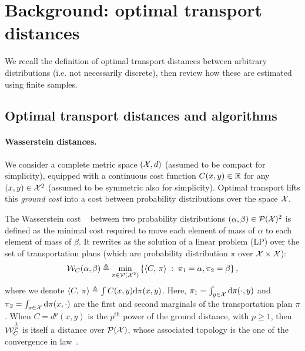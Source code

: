 \section{Background: optimal transport distances}

We recall the definition of optimal transport distances between arbitrary distributions (i.e. not necessarily discrete), then review how these are estimated using finite samples.

\subsection{Optimal transport distances and algorithms}

\paragraph{Wasserstein distances.} 

We consider a complete metric space $(\mathcal{X},d)$ (assumed to be compact for simplicity), equipped
with a continuous cost function $C(x,y) \in \mathbb{R}$ for any $(x,y) \in \mathcal{X}^2$ (assumed to be symmetric also for simplicity). 
%
Optimal transport lifts this \textit{ground cost} into a cost between probability
distributions over the space $\mathcal{X}$. 
%

The Wasserstein cost   between two probability distributions $(\alpha, \beta) \in \mathcal{P}(\mathcal{X})^2$ is defined as the minimal cost required to move each element of mass of $\alpha$ to each element of mass of $\beta$. It rewrites as the solution of a
linear problem (LP) over the set of transportation plans (which are probability distribution $\pi$ over $\mathcal{X} \times \mathcal{X}$):
\begin{equation}\label{eq:wass}
    \mathcal{W}_C(\alpha, \beta) \triangleq 
    \min_{\pi \in \mathcal{P}(\mathcal{X}^2)}
    \left\{ 
    	\langle C,\,\pi\rangle
	 \;:\;  \pi_1=\alpha, \pi_2=\beta \right\},
\end{equation}
where we denote $\langle C,\,\pi\rangle \triangleq \int C(x,y) \textrm{d}\pi(x,y)$. Here,  
$\pi_1 = \int_{y\in \mathcal{X}} \textrm{d} \pi(\cdot, y)$ and $\pi_2 = \int_{x\in \mathcal{X}} \textrm{d}
\pi(x, \cdot)$ are the first and second marginals of the transportation plan $\pi$. 
%
When $C=d^p(x,y)$ is the $p^{\text{th}}$ power of the ground distance, with $p \geq 1$, then $\mathcal{W}_C^{\frac{1}{p}}$ is itself a distance over $\mathcal{P}(\mathcal{X})$, whose associated topology is the one of the convergence in law~\cite{santambrogio2015optimal}.

